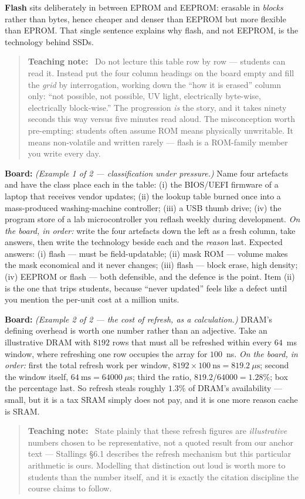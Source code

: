 \documentclass[11pt]{article}
\newenvironment{teachingaside}{\begin{quote}\small\color{primary-gold}\textbf{Teaching note:}\ }{\end{quote}}
\begin{document}
\textbf{Flash} sits deliberately in between EPROM and EEPROM: erasable in \emph{blocks} rather than bytes, hence cheaper and denser than EEPROM but more flexible than EPROM. That single sentence explains why flash, and not EEPROM, is the technology behind SSDs.

\begin{teachingaside}
Do not lecture this table row by row --- students can read it. Instead put the four column headings on the board empty and fill the \emph{grid} by interrogation, working down the ``how it is erased'' column only: ``not possible, not possible, UV light, electrically byte-wise, electrically block-wise.'' The progression \emph{is} the story, and it takes ninety seconds this way versus five minutes read aloud. The misconception worth pre-empting: students often assume ROM means physically unwritable. It means non-volatile and written rarely --- flash is a ROM-family member you write every day.
\end{teachingaside}

\textbf{Board:} \textit{(Example 1 of 2 --- classification under pressure.)} Name four artefacts and have the class place each in the table: (i) the BIOS/UEFI firmware of a laptop that receives vendor updates; (ii) the lookup table burned once into a mass-produced washing-machine controller; (iii) a USB thumb drive; (iv) the program store of a lab microcontroller you reflash weekly during development. \emph{On the board, in order:} write the four artefacts down the left as a fresh column, take answers, then write the technology beside each and the \emph{reason} last. Expected answers: (i) flash --- must be field-updatable; (ii) mask ROM --- volume makes the mask economical and it never changes; (iii) flash --- block erase, high density; (iv) EEPROM or flash --- both defensible, and the defence is the point. Item (ii) is the one that trips students, because ``never updated'' feels like a defect until you mention the per-unit cost at a million units.

\textbf{Board:} \textit{(Example 2 of 2 --- the cost of refresh, as a calculation.)} DRAM's defining overhead is worth one number rather than an adjective. Take an illustrative DRAM with $8192$ rows that must all be refreshed within every $64$~ms window, where refreshing one row occupies the array for $100$~ns. \emph{On the board, in order:} first the total refresh work per window, $8192 \times 100~\text{ns} = 819.2~\mu\text{s}$; second the window itself, $64~\text{ms} = 64000~\mu\text{s}$; third the ratio, $819.2/64000 = 1.28\%$; box the percentage last. So refresh steals roughly $1.3\%$ of DRAM's availability --- small, but it is a tax SRAM simply does not pay, and it is one more reason cache is SRAM.
\begin{teachingaside}
State plainly that these refresh figures are \emph{illustrative} numbers chosen to be representative, not a quoted result from our anchor text --- Stallings \S6.1 describes the refresh mechanism but this particular arithmetic is ours. Modelling that distinction out loud is worth more to students than the number itself, and it is exactly the citation discipline the course claims to follow.
\end{teachingaside}
\end{document}

